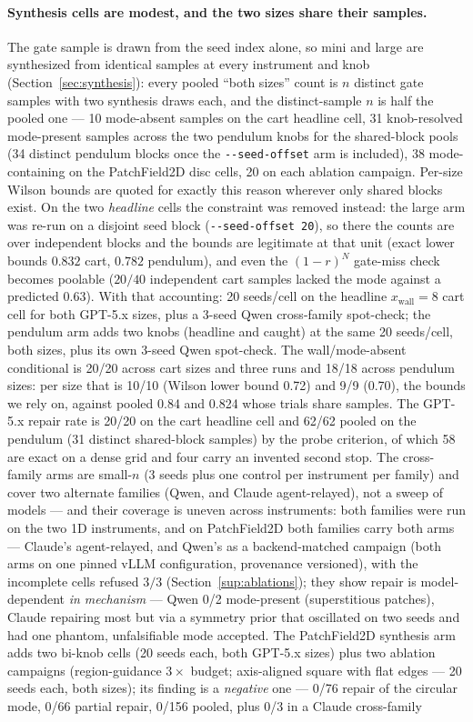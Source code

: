 \documentclass[11pt]{article}
\theoremstyle{definition}
\theoremstyle{remark}
\begin{document}
\paragraph{Synthesis cells are modest, and the two sizes share their samples.} The gate sample is drawn from the seed index alone, so mini and large are synthesized from identical samples at every instrument and knob (Section~\ref{sec:synthesis}): every pooled ``both sizes'' count is $n$ distinct gate samples with two synthesis draws each, and the distinct-sample $n$ is half the pooled one --- 10 mode-absent samples on the cart headline cell, 31 knob-resolved mode-present samples across the two pendulum knobs for the shared-block pools (34 distinct pendulum blocks once the \texttt{-{}-seed-offset} arm is included), 38 mode-containing on the PatchField2D disc cells, 20 on each ablation campaign. Per-size Wilson bounds are quoted for exactly this reason wherever only shared blocks exist. On the two \emph{headline} cells the constraint was removed instead: the large arm was re-run on a disjoint seed block (\texttt{-{}-seed-offset 20}), so there the counts are over independent blocks and the bounds are legitimate at that unit (exact lower bounds $0.832$ cart, $0.782$ pendulum), and even the $(1-r)^N$ gate-miss check becomes poolable ($20/40$ independent cart samples lacked the mode against a predicted $0.63$). With that accounting: 20 seeds/cell on the headline $x_\mathrm{wall} = 8$ cart cell for both GPT-5.x sizes, plus a 3-seed Qwen cross-family spot-check; the pendulum arm adds two knobs (headline and caught) at the same 20 seeds/cell, both sizes, plus its own 3-seed Qwen spot-check. The wall/mode-absent conditional is 20/20 across cart sizes and three runs and 18/18 across pendulum sizes: per size that is 10/10 (Wilson lower bound 0.72) and 9/9 (0.70), the bounds we rely on, against pooled 0.84 and 0.824 whose trials share samples. The GPT-5.x repair rate is 20/20 on the cart headline cell and 62/62 pooled on the pendulum (31 distinct shared-block samples) by the probe criterion, of which 58 are exact on a dense grid and four carry an invented second stop. The cross-family arms are small-$n$ (3 seeds plus one control per instrument per family) and cover two alternate families (Qwen, and Claude agent-relayed), not a sweep of models --- and their coverage is uneven across instruments: both families were run on the two 1D instruments, and on PatchField2D both families carry both arms --- Claude's agent-relayed, and Qwen's as a backend-matched campaign (both arms on one pinned vLLM configuration, provenance versioned), with the incomplete cells refused $3/3$ (Section~\ref{sup:ablations}); they show repair is model-dependent \emph{in mechanism} --- Qwen 0/2 mode-present (superstitious patches), Claude repairing most but via a symmetry prior that oscillated on two seeds and had one phantom, unfalsifiable mode accepted. The PatchField2D synthesis arm adds two bi-knob cells (20 seeds each, both GPT-5.x sizes) plus two ablation campaigns (region-guidance $3\times$ budget; axis-aligned square with flat edges --- 20 seeds each, both sizes); its finding is a \emph{negative} one --- 0/76 repair of the circular mode, 0/66 partial repair, 0/156 pooled, plus 0/3 in a Claude cross-family 
\end{document}
